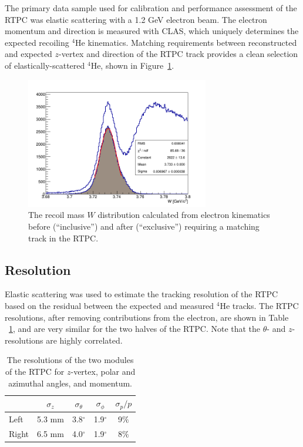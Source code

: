 \documentclass[preprint,5p]{elsarticle}
\begin{document}
The primary data sample used for calibration and performance assessment of the
RTPC was elastic scattering with a 1.2 GeV electron beam. The electron momentum
and direction is measured with CLAS, which uniquely determines the expected recoiling
$^4$He kinematics. Matching requirements between reconstructed and expected $z$-vertex
and direction of the RTPC track provides a clean selection of elastically-scattered
$^4$He, shown in Figure~\ref{fig:w}.

\begin{figure}[tb]\centering
  \includegraphics[width=8cm]{fit_W_distribution_l.png}
  \caption{The recoil mass $W$ distribution calculated from electron kinematics 
  before (``inclusive'') and after (``exclusive'') requiring a matching track 
  in the RTPC.\label{fig:w}}
\end{figure}


\subsection{Resolution}

Elastic scattering was used to estimate the tracking resolution of the RTPC 
based on the residual between the expected and measured $^4$He tracks.  The RTPC
resolutions, after removing contributions from the electron, are shown in Table
~\ref{tab:reso}, and are very similar for the two halves of the RTPC.  Note that the
$\theta$- and $z$-resolutions are highly correlated.
\begin{table}[htbp]
\begin{center}
\begin{tabular}{|l|cccc|}
  \hline
& $\sigma_{z}$ &  $\sigma_{\theta}$ & $\sigma_{\phi}$ & $\sigma_{p}/p$\\
\hline
Left &  5.3 mm & 3.8$^{\circ}$ & 1.9$^{\circ}$ & 9$\%$ \\
Right & 6.5 mm & 4.0$^{\circ}$ & 1.9$^{\circ}$ & 8$\%$\\
\hline
\end{tabular}
\caption{The resolutions of the two modules of the RTPC for $z$-vertex, polar and azimuthal angles, and momentum.}
\label{tab:reso}
\end{center}
\end{table}
\end{document}
